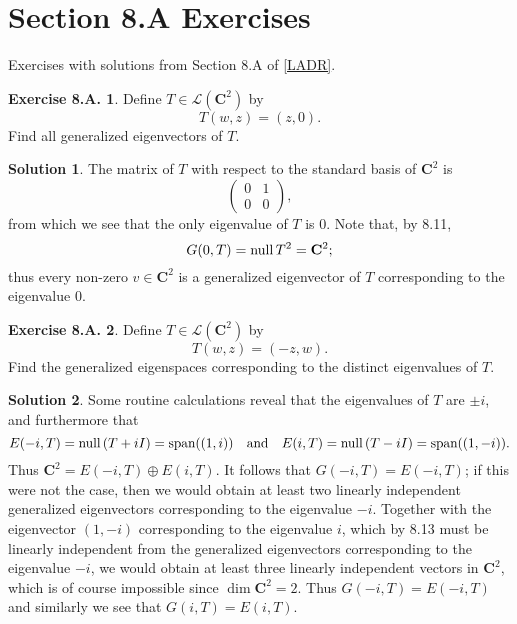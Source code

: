 \documentclass[12pt]{article}
\theoremstyle{definition}
\theoremstyle{exercise}
\newtheorem{exercise}{Exercise 8.A.}
\theoremstyle{solution}
\newtheorem*{solution}{Solution}
\newcommand{\lmap}{\mathcal{L}}
\newcommand{\Span}{\text{span}}
\newcommand{\Null}{\text{null\,}}
\newcommand{\quand}{\quad \text{and} \quad}
\newcommand{\C}{\mathbf{C}}
\begin{document}
\section{Section 8.A Exercises}

Exercises with solutions from Section 8.A of \hyperlink{ladr}{[LADR]}.

\begin{exercise}
\label{ex:1}
    Define \( T \in \lmap(\C^2) \) by
    \[
        T(w, z) = (z, 0).
    \]
    Find all generalized eigenvectors of \( T \).
\end{exercise}

\begin{solution}
    The matrix of \( T \) with respect to the standard basis of \( \C^2 \) is
    \[
        \begin{pmatrix}
            0 & 1 \\
            0 & 0
        \end{pmatrix},
    \]
    from which we see that the only eigenvalue of \( T \) is 0. Note that, by 8.11,
    \[
        G(0, T) = \Null T^2 = \C^2;
    \]
    thus every non-zero \( v \in \C^2 \) is a generalized eigenvector of \( T \) corresponding to the eigenvalue 0.
\end{solution}

\begin{exercise}
\label{ex:2}
    Define \( T \in \lmap(\C^2) \) by
    \[
        T(w, z) = (-z, w).
    \]
    Find the generalized eigenspaces corresponding to the distinct eigenvalues of \( T \).
\end{exercise}

\begin{solution}
    Some routine calculations reveal that the eigenvalues of \( T \) are \( \pm i \), and furthermore that
    \[
        E(-i, T) = \Null (T + iI) = \Span ((1, i)) \quand E(i, T) = \Null (T - iI) = \Span((1, -i)).
    \]
    Thus \( \C^2 = E(-i, T) \oplus E(i, T) \). It follows that \( G(-i, T) = E(-i, T) \); if this were not the case, then we would obtain at least two linearly independent generalized eigenvectors corresponding to the eigenvalue \( -i \). Together with the eigenvector \( (1, -i) \) corresponding to the eigenvalue \( i \), which by 8.13 must be linearly independent from the generalized eigenvectors corresponding to the eigenvalue \( -i \), we would obtain at least three linearly independent vectors in \( \C^2 \), which is of course impossible since \( \dim \C^2 = 2 \). Thus \( G(-i, T) = E(-i, T) \) and similarly we see that \( G(i, T) = E(i, T) \).
\end{solution}
\end{document}
